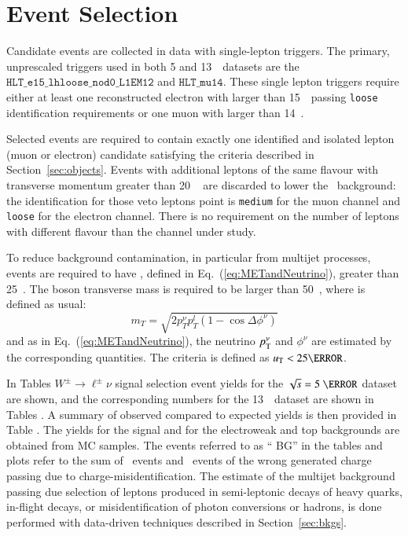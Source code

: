 \chapter{Event Selection}
\label{sec:eventSel}

Candidate \Wln{} events are collected in data with single-lepton triggers. The primary, unprescaled triggers used in both 5 and 13~\TeV\ datasets are the $\texttt{HLT\_e15\_lhloose\_nod0\_L1EM12}$ and $\texttt{HLT\_mu14}$. These single lepton triggers require either at least one reconstructed electron with \ET larger than 15~\GeV\ passing \texttt{loose} identification requirements or one muon with \pt larger than 14~\GeV.

Selected events are required to contain exactly one identified and isolated lepton (muon or electron) candidate satisfying the criteria described in Section~\ref{sec:objects}.
Events with additional leptons of the same flavour with transverse momentum greater than 20 ~\GeV{} are discarded to lower the \Zboson\ background: the identification for those veto leptons point is \texttt{medium} for the muon channel and \texttt{loose} for the electron channel. There is no requirement on the number of leptons with different flavour than the channel under study.

To reduce background contamination, in particular from multijet
processes, events are required to have \MET{} , defined in
Eq.~(\ref{eq:METandNeutrino}), greater than 25~\GeV{}.  The \Wboson{}
boson transverse mass \mt{} is required to be larger than 50~\GeV,
where \mt{} is defined as usual:
\begin{equation}\label{eq:mt}
{m}_{T} = \sqrt{2 {p}_{T}^{\nu}p_{T} ^{l} (1-\cos\Delta\phi^{\nu})}
\end{equation}
and as in Eq.~(\ref{eq:METandNeutrino}), the neutrino $p_{\text{T}}^\nu$ and $\phi^\nu$ are estimated by the corresponding \MET{} quantities. The \ut criteria is defined as $\ut < 25 \GeV$.

In
Tables 
$W^{\pm} \rightarrow \ell^{\pm}\nu$ signal selection event yields for
the $\sqrt{s} = 5~\TeV$ dataset are shown, and the corresponding
numbers for the 13~\TeV\ dataset are shown in
Tables . A
summary of observed compared to expected yields is then provided in
Table .  The yields for the signal and for the
electroweak and top backgrounds are obtained from MC samples.  The
events referred to as ``\Wln{} BG'' in the tables and plots refer to
the sum of \Wtaunu\ events and \Wln\ events of the wrong generated
charge passing due to charge-misidentification.  The estimate of the
multijet background passing due selection of leptons produced in
semi-leptonic decays of heavy quarks, in-flight decays, or
misidentification of photon conversions or hadrons, is done performed with
data-driven techniques described in Section~\ref{sec:bkgs}.


